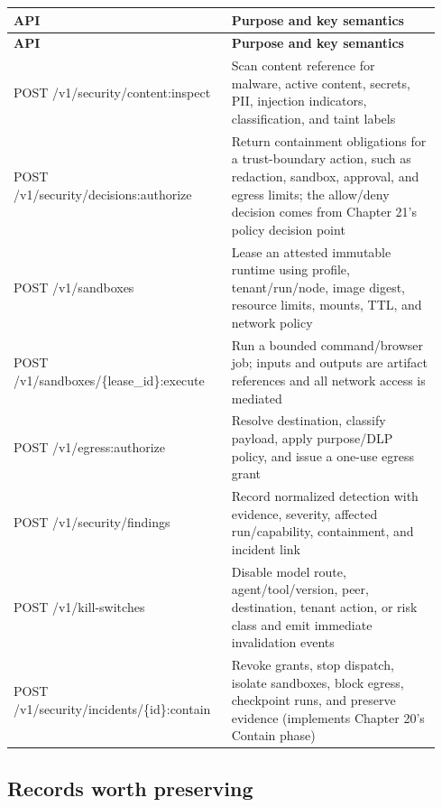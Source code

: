 \BookTableStart
\small
\begin{longtable}{@{}Y{0.4700\linewidth}Y{0.4700\linewidth}@{}}
\color{white}\bfseries \textbf{API} & \color{white}\bfseries \textbf{Purpose and key semantics} \\
\endfirsthead
{}
\color{white}\bfseries \textbf{API} & \color{white}\bfseries \textbf{Purpose and key semantics} \\
\endhead
POST /v1/security/content:inspect & Scan content reference for malware, active content, secrets, PII, injection indicators, classification, and taint labels \\
POST /v1/security/decisions:authorize & Return containment obligations for a trust-boundary action, such as redaction, sandbox, approval, and egress limits; the allow/deny decision comes from Chapter 21's policy decision point \\
POST /v1/sandboxes & Lease an attested immutable runtime using profile, tenant/run/node, image digest, resource limits, mounts, TTL, and network policy \\
POST /v1/sandboxes/\{lease\_id\}:execute & Run a bounded command/browser job; inputs and outputs are artifact references and all network access is mediated \\
POST /v1/egress:authorize & Resolve destination, classify payload, apply purpose/DLP policy, and issue a one-use egress grant \\
POST /v1/security/findings & Record normalized detection with evidence, severity, affected run/capability, containment, and incident link \\
POST /v1/kill-switches & Disable model route, agent/tool/version, peer, destination, tenant action, or risk class and emit immediate invalidation events \\
POST /v1/security/incidents/\{id\}:contain & Revoke grants, stop dispatch, isolate sandboxes, block egress, checkpoint runs, and preserve evidence (implements Chapter 20's Contain phase) \\
\end{longtable}
\BookTableEnd

\subsection{Records worth preserving}

